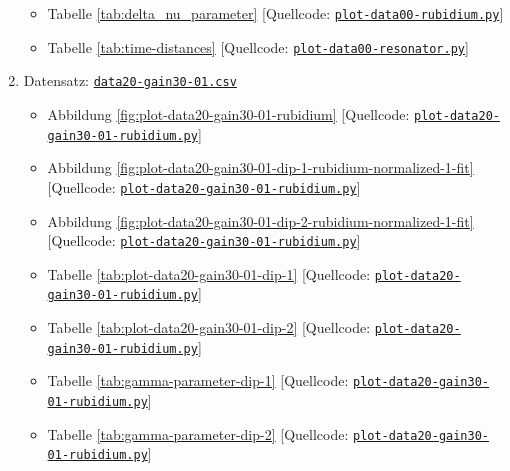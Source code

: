 \begin{appendix}
\begin{enumerate}[1.]
\begin{itemize}
        \item Tabelle \ref{tab:delta_nu_parameter} [Quellcode: \href{https://github.com/DaHaCoder/H2-Auswertung/blob/main/code/plot-data00-rubidium.py}{\lstinline{plot-data00-rubidium.py}}]
        \item Tabelle \ref{tab:time-distances} [Quellcode: \href{https://github.com/DaHaCoder/H2-Auswertung/blob/main/code/plot-data00-resonator.py}{\lstinline{plot-data00-resonator.py}}]
    \end{itemize}
    \item Datensatz: \href{https://github.com/DaHaCoder/H2-Auswertung/blob/main/data/data20-gain30-01.csv}{\lstinline{data20-gain30-01.csv}}
    \begin{itemize}
        \item Abbildung \ref{fig:plot-data20-gain30-01-rubidium} [Quellcode: \href{https://github.com/DaHaCoder/H2-Auswertung/blob/main/code/plot-data20-gain30-01-rubidium.py}{\lstinline{plot-data20-gain30-01-rubidium.py}}]
        \item Abbildung \ref{fig:plot-data20-gain30-01-dip-1-rubidium-normalized-1-fit} [Quellcode: \href{https://github.com/DaHaCoder/H2-Auswertung/blob/main/code/plot-data20-gain30-01-rubidium.py}{\lstinline{plot-data20-gain30-01-rubidium.py}}]
        \item Abbildung \ref{fig:plot-data20-gain30-01-dip-2-rubidium-normalized-1-fit} [Quellcode: \href{https://github.com/DaHaCoder/H2-Auswertung/blob/main/code/plot-data20-gain30-01-rubidium.py}{\lstinline{plot-data20-gain30-01-rubidium.py}}]
        \item Tabelle \ref{tab:plot-data20-gain30-01-dip-1} [Quellcode: \href{https://github.com/DaHaCoder/H2-Auswertung/blob/main/code/plot-data20-gain30-01-rubidium.py}{\lstinline{plot-data20-gain30-01-rubidium.py}}]
        \item Tabelle \ref{tab:plot-data20-gain30-01-dip-2} [Quellcode: \href{https://github.com/DaHaCoder/H2-Auswertung/blob/main/code/plot-data20-gain30-01-rubidium.py}{\lstinline{plot-data20-gain30-01-rubidium.py}}]
        \item Tabelle \ref{tab:gamma-parameter-dip-1} [Quellcode: \href{https://github.com/DaHaCoder/H2-Auswertung/blob/main/code/plot-data20-gain30-01-rubidium.py}{\lstinline{plot-data20-gain30-01-rubidium.py}}]
        \item Tabelle \ref{tab:gamma-parameter-dip-2} [Quellcode: \href{https://github.com/DaHaCoder/H2-Auswertung/blob/main/code/plot-data20-gain30-01-rubidium.py}{\lstinline{plot-data20-gain30-01-rubidium.py}}]

\end{itemize}
\end{enumerate}
\end{appendix}
